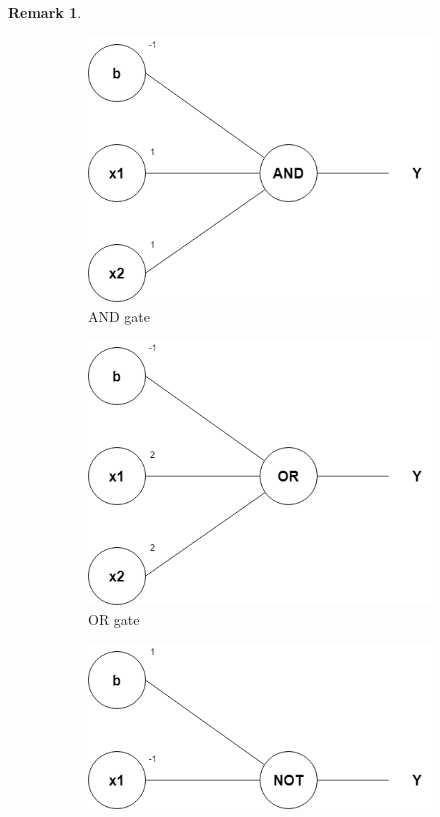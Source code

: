 \documentclass{article}
\theoremstyle{definition}
\newtheorem{remark}[theorem]{Remark}
\begin{document}
\begin{remark}
\begin{figure}[H]
    \centering
    \begin{subfigure}[b]{0.3\textwidth}
        \includegraphics[width=\textwidth]{graphics/AND_gate.png}
        \caption{AND gate}
        \label{fig:AND}
    \end{subfigure}
    \begin{subfigure}[b]{0.3\textwidth}
        \includegraphics[width=\textwidth]{graphics/OR_gate.png}
        \caption{OR gate}
        \label{fig:OR}
    \end{subfigure}
    \begin{subfigure}[b]{0.3\textwidth}
        \includegraphics[width=\textwidth]{graphics/NOT_gate.png}

\end{subfigure}
\end{figure}
\end{remark}
\end{document}
